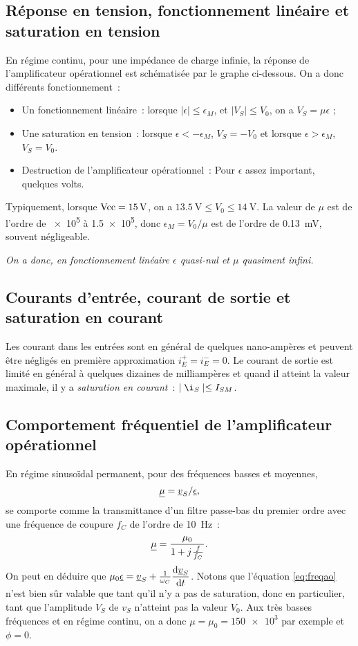 \subsection{Réponse en tension, fonctionnement linéaire et saturation en tension}
En régime continu, pour une impédance de charge infinie, la réponse de l'amplificateur opérationnel est schématisée par le graphe ci-dessous.%
On a donc différents fonctionnement~:
\begin{itemize}
	\item Un fonctionnement linéaire~: lorsque \(\mid \epsilon \mid \leq \epsilon_M\), et \(\mid V_S \mid \leq V_0\), on a \(V_S = \mu \epsilon\) ;
	\item Une saturation en tension~: lorsque \(\epsilon < -\epsilon_M\), \(V_S = -V_0\) et lorsque \(\epsilon > \epsilon_M\), \(V_S = V_0\).
	\item Destruction de l'amplificateur opérationnel~: Pour \(\epsilon\) assez important, quelques volts.
\end{itemize}
Typiquement, lorsque \(\textrm{Vcc} = \SI{15}{\volt}\), on a \(\SI{13.5}{\volt} \leq V_0 \leq \SI{14}{\volt}\). La valeur de \(\mu\) est de l'ordre de \num{e5} à \num{1.5e5}, donc \(\epsilon_M = V_0/\mu\) est de l'ordre de \SI{0.13}{\milli\volt}, souvent négligeable.

\emph{On a donc, en fonctionnement linéaire \(\epsilon\) quasi-nul et \(\mu\) quasiment infini.}
\subsection{Courants d'entrée, courant de sortie et saturation en courant}
Les courant dans les entrées sont en général de quelques nano-ampères et peuvent être négligés en première approximation \(i_E^+ = i_E^-=0\). Le courant de sortie est limité en général à quelques dizaines de milliampères et quand il atteint la valeur maximale, il y  a \emph{saturation en courant}~: \(\mid \i_S \mid \leq I_{SM}\).
\subsection{Comportement fréquentiel de l'amplificateur opérationnel}
En régime sinusoïdal permanent, pour des fréquences basses et moyennes,
\begin{equation}
	\label{eq:freqao}
	\underline{\mu} = \underline{v}_S / \underline{\epsilon},
\end{equation}
se comporte comme la transmittance d'un filtre passe-bas du premier ordre avec une fréquence de coupure \(f_C\) de l'ordre de \SI{10}{\hertz}~:
\begin{equation}
	\underline{\mu} = \frac{\mu_0}{1+{j\mkern1mu} \frac{f}{f_C}}.
\end{equation}
On peut en déduire que \( \mu_0 \underline{\epsilon} = \underline{v}_S + \frac{1}{\omega_C} \dfrac{\mathrm{d} \underline{v}_S}{\mathrm{d} t}\). Notons que l'équation \eqref{eq:freqao} n'est bien sûr valable que tant qu'il n'y a pas de saturation, donc en particulier, tant que l'amplitude \(V_S\) de \(v_S\) n'atteint pas la valeur \(V_0\). Aux très basses fréquences et en régime continu, on a donc \(\mu = \mu_0 = \num{150e3}\) par exemple et \(\phi=0\).

